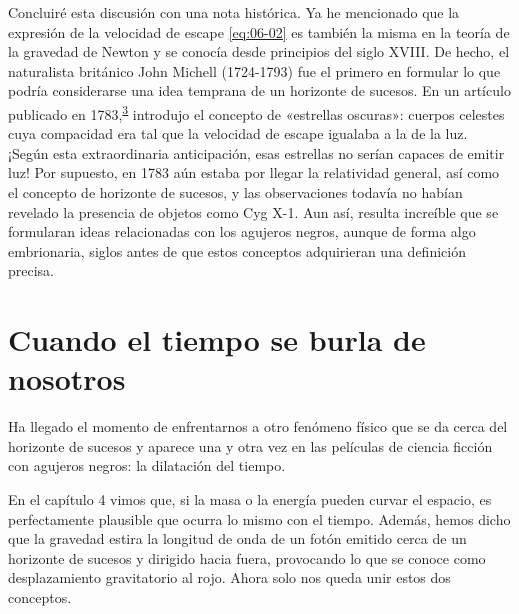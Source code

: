 Concluiré esta discusión con una nota histórica. Ya he mencionado que la expresión de la velocidad de escape \eqref{eq:06-02} es también la misma en la teoría de la gravedad de Newton y se conocía desde principios del siglo XVIII. De hecho, el naturalista británico John Michell (1724-1793) fue el primero en formular lo que podría considerarse una idea temprana de un horizonte de sucesos. En un artículo publicado en 1783,\textsuperscript{\hyperlink{note:06-03}{3}} introdujo el concepto de «estrellas oscuras»: cuerpos celestes cuya compacidad era tal que la velocidad de escape igualaba a la de la luz. ¡Según esta extraordinaria anticipación, esas estrellas no serían capaces de emitir luz! Por supuesto, en 1783 aún estaba por llegar la relatividad general, así como el concepto de horizonte de sucesos, y las observaciones todavía no habían revelado la presencia de objetos como Cyg X-1. Aun así, resulta increíble que se formularan ideas relacionadas con los agujeros negros, aunque de forma algo embrionaria, siglos antes de que estos conceptos adquirieran una definición precisa.

\section{Cuando el tiempo se burla de nosotros}\label{sec:06-time}

Ha llegado el momento de enfrentarnos a otro fenómeno físico que se da cerca del horizonte de sucesos y aparece una y otra vez en las películas de ciencia ficción con agujeros negros: la dilatación del tiempo.

En el capítulo 4 vimos que, si la masa o la energía pueden curvar el espacio, es perfectamente plausible que ocurra lo mismo con el tiempo. Además, hemos dicho que la gravedad estira la longitud de onda de un fotón emitido cerca de un horizonte de sucesos y dirigido hacia fuera, provocando lo que se conoce como desplazamiento gravitatorio al rojo. Ahora solo nos queda unir estos dos conceptos.

